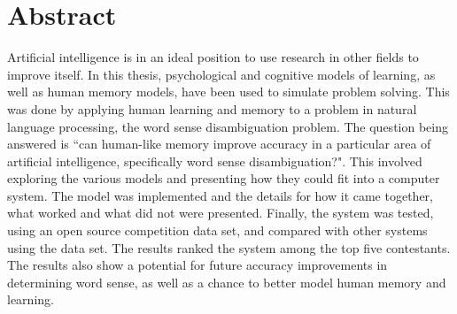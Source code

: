 \doublespacing 
\chapter*{Abstract}

Artificial intelligence is in an ideal position to use research in other fields
to improve itself.  In this thesis, psychological and cognitive
models of learning, as well as human memory models, have been used to simulate problem
solving.  This was done by applying human learning and memory to a problem in
natural language processing, the word sense disambiguation problem. The question being 
answered is ``can human-like memory improve accuracy in a particular area of artificial
intelligence, specifically word sense disambiguation?". This involved exploring the 
various models and presenting how they could fit into a computer system.  The model was
implemented and the details for how it came together, what worked and what did not were
presented.  Finally, the system was tested, using an open source competition data set, 
and compared with other systems using the data set.  The results ranked the system among
the top five contestants. The results also show a potential for future accuracy 
improvements in determining word sense, as well as a chance to better model human memory 
and learning.
